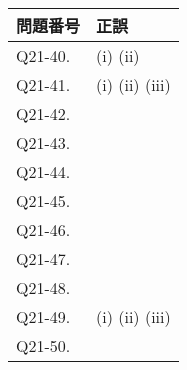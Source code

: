 \documentclass[uplatex,dvipdfmx,a4paper,11pt]{jlreq}
\numberwithin{equation}{section}
\theoremstyle{definition}
\begin{document}
\begin{table}[hbtp]
  \label{table:data_type}
  \centering
  \begin{tabular}{ll}
    \hline
    問題番号    & 正誤                                                                                                                                                             \\
    \hline \hline
    Q21-40. & (i) \quad (ii) \quad                                                                                                                                           \\
    Q21-41. & (i) \quad (ii) \quad (iii) \quad                                                                                                                               \\
    Q21-42. & \quad                                                                                                                                                          \\
    Q21-43. & \quad                                                                                                                                                          \\
    Q21-44. & \quad                                                                                                                                                          \\
    Q21-45. & \quad                                                                                                                                                          \\
    Q21-46. & \quad                                                                                                                                                          \\
    Q21-47. & \quad                                                                                                                                                          \\
    Q21-48. & \quad                                                                                                                                                          \\
    Q21-49. & (i) \quad (ii) \quad (iii) \quad                                                                                                                               \\
    Q21-50. & \quad                                                                                                                                                          \\

\end{tabular}
\end{table}
\end{document}
